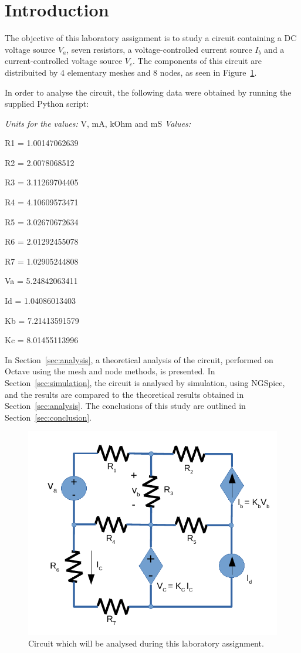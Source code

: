 \section{Introduction}
\label{sec:introduction}
The objective of this laboratory assignment is to study a circuit containing a
DC voltage source $V_a$, seven resistors, a voltage-controlled current source $I_b$ and
a current-controlled voltage source $V_c$. The components of this circuit are distribuited 
by 4 elementary meshes and 8 nodes, as seen in Figure~\ref{fig:circuit}. 

In order to analyse the circuit, the following data were obtained by running the supplied Python script: 

\textit{Units for the values:} V, mA, kOhm and mS
\textit{Values:} 

R1 = 1.00147062639\par
R2 = 2.0078068512\par
R3 = 3.11269704405\par
R4 = 4.10609573471\par
R5 = 3.02670672634\par
R6 = 2.01292455078\par
R7 = 1.02905244808\par
Va = 5.24842063411\par
Id = 1.04086013403\par
Kb = 7.21413591579\par
Kc = 8.01455113996


In Section~\ref{sec:analysis}, a theoretical analysis of the circuit, performed on Octave
using the mesh and node methods, is presented. In Section~\ref{sec:simulation}, the 
circuit is analysed by simulation, using NGSpice, and the results are compared to 
the theoretical results obtained in Section~\ref{sec:analysis}. The conclusions 
of this study are outlined in Section~\ref{sec:conclusion}.

\begin{figure}[H] \centering
\includegraphics[width=0.4\linewidth]{circuit.pdf}
\caption{Circuit which will be analysed during this laboratory assignment.}
\label{fig:circuit}
\end{figure}

